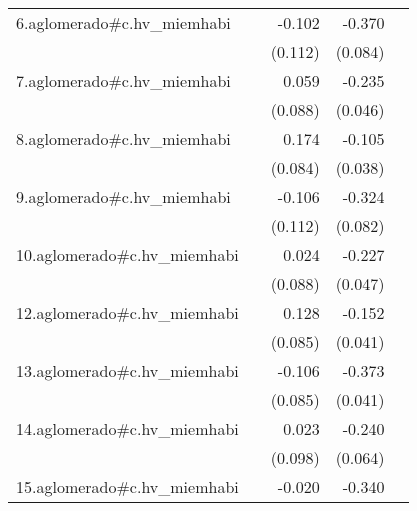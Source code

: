 {\begin{longtable}{l*{4}{D{.}{.}{-1}}}
\addlinespace
6.aglomerado#c.hv\_miemhabi&                     &      -0.102         &      -0.370\sym{***}&                     \\
            &                     &     (0.112)         &     (0.084)         &                     \\
\addlinespace
7.aglomerado#c.hv\_miemhabi&                     &       0.059         &      -0.235\sym{***}&                     \\
            &                     &     (0.088)         &     (0.046)         &                     \\
\addlinespace
8.aglomerado#c.hv\_miemhabi&                     &       0.174\sym{*}  &      -0.105\sym{**} &                     \\
            &                     &     (0.084)         &     (0.038)         &                     \\
\addlinespace
9.aglomerado#c.hv\_miemhabi&                     &      -0.106         &      -0.324\sym{***}&                     \\
            &                     &     (0.112)         &     (0.082)         &                     \\
\addlinespace
10.aglomerado#c.hv\_miemhabi&                     &       0.024         &      -0.227\sym{***}&                     \\
            &                     &     (0.088)         &     (0.047)         &                     \\
\addlinespace
12.aglomerado#c.hv\_miemhabi&                     &       0.128         &      -0.152\sym{***}&                     \\
            &                     &     (0.085)         &     (0.041)         &                     \\
\addlinespace
13.aglomerado#c.hv\_miemhabi&                     &      -0.106         &      -0.373\sym{***}&                     \\
            &                     &     (0.085)         &     (0.041)         &                     \\
\addlinespace
14.aglomerado#c.hv\_miemhabi&                     &       0.023         &      -0.240\sym{***}&                     \\
            &                     &     (0.098)         &     (0.064)         &                     \\
\addlinespace
15.aglomerado#c.hv\_miemhabi&                     &      -0.020         &      -0.340\sym{***}&                     \\

\end{longtable}}
